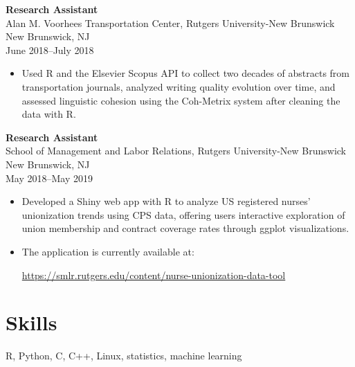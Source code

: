 \documentclass[letterpaper,11pt]{article}
\begin{document}
\textbf{Research Assistant} \\
Alan M. Voorhees Transportation Center, Rutgers University-New Brunswick \\
New Brunswick, NJ \\
June 2018--July 2018
\begin{itemize}
  \item Used R and the Elsevier Scopus API to collect two decades of abstracts from transportation journals, analyzed
        writing quality evolution over time, and assessed linguistic cohesion using the Coh-Metrix system after cleaning
        the data with R.
\end{itemize}

\textbf{Research Assistant} \\
School of Management and Labor Relations, Rutgers University-New Brunswick \\
New Brunswick, NJ \\
May 2018--May 2019
\begin{itemize}
  \item Developed a Shiny web app with R to analyze US registered nurses' unionization trends using CPS data, offering
        users interactive exploration of union membership and contract coverage rates through ggplot visualizations.
  \item The application is currently available at:
        \begin{center}
          \url{https://smlr.rutgers.edu/content/nurse-unionization-data-tool}
        \end{center}
\end{itemize}

\section*{Skills}

R, Python, C, C++, Linux, statistics, machine learning
\end{document}
